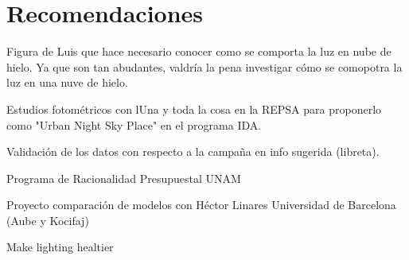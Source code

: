 \chapter{Recomendaciones}
\label{chap:recomendaciones}
 

Figura de Luis que hace necesario conocer como se comporta la luz en nube de hielo. Ya que son tan abudantes, valdría la pena investigar cómo se comopotra la luz en una nuve de hielo. 

Estudios fotométricos con lUna y toda la cosa en la REPSA para proponerlo como "Urban Night Sky Place" en el programa IDA.

Validación de los datos con respecto a la campaña en info sugerida (libreta).

Programa de Racionalidad Presupuestal UNAM

Proyecto comparación de modelos con Héctor Linares Universidad de Barcelona (Aube y Kocifaj)

Make lighting healtier